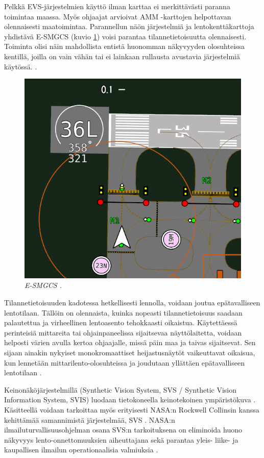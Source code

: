 \documentclass[utf8,bachelor,manualbib]{gradu3}
\begin{document}
Pelkkä EVS-järjestelmien käyttö ilman karttaa ei merkittävästi paranna toimintaa maassa. Myös ohjaajat arvioivat AMM -karttojen helpottavan olennaisesti maatoimintaa. Parannellun näön järjestelmiä ja lentokenttäkarttoja yhdistävä E-SMGCS (kuvio \ref{F:E-SMGCS}) voisi parantaa tilannetietoisuutta olennaisesti. Toiminta olisi näin mahdollista entistä huonomman näkyvyyden olosuhteissa kentillä, joilla on vain vähän tai ei lainkaan rullausta avustavia järjestelmiä käytössä. \citep{prinzelym2013}.

\begin{figure}
\centering
\includegraphics[width=12cm]{E-SMGCS.png}
\caption{\itshape E-SMGCS \citep{prinzelym2013}.}
\label{F:E-SMGCS}
\end{figure}

Tilannetietoisuuden kadotessa hetkellisesti lennolla, voidaan joutua epätavalliseen lentotilaan. Tällöin on olennaista, kuinka nopeasti tilannetietoisuus saadaan palautettua ja virheellinen lentoasento tehokkaasti oikaistua. Käytettäessä perinteisiä mittareita tai ohjainpaneelissa sijaitsevaa näyttölaitetta, voidaan helposti värien avulla kertoa ohjaajalle, missä päin maa ja taivas sijaitsevat. Sen sijaan ainakin nykyiset monokromaattiset heijastusnäytöt vaikeuttavat oikaisua, kun lennetään mittarilento-olosuhteissa ja joudutaan yllättäen epätavalliseen lentotilaan \citep{crawfordneal2006}.

Keinonäköjärjestelmillä (Synthetic Vision System, SVS / Synthetic Vision Information System, SVIS) luodaan tietokoneella keinotekoinen ympäristökuva \citep{baileyym2007}. Käsitteellä voidaan tarkoittaa myös erityisesti NASA:n Rockwell Collinsin kanssa kehittämää samannimistä järjestelmää, SVS \citep{crawfordneal2006}. NASA:n ilmailuturvallisuusohjelman osana SVS:n tarkoituksena on eliminoida huono näkyvyys lento-onnettomuuksien aiheuttajana sekä parantaa yleis- liike- ja kaupallisen ilmailun operationaalisia valmiuksia \citeyearpar{prinzelym2004}.
\end{document}
